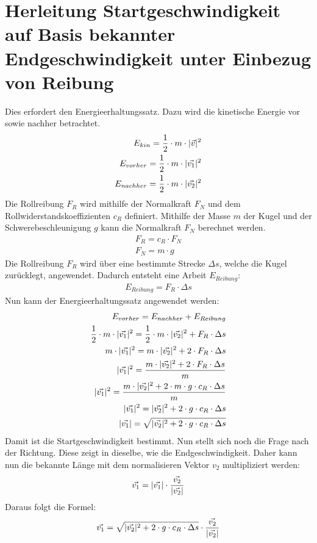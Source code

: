 \section{Herleitung Startgeschwindigkeit auf Basis bekannter Endgeschwindigkeit unter Einbezug von Reibung}\label{anhang:herleitung:StartgeschwAnhandEndgeschwMitReibung}
Dies erfordert den Energieerhaltungssatz. Dazu wird die kinetische Energie vor sowie nachher betrachtet.
\begin{align}
    E_{kin} = \frac{1}{2} \cdot m \cdot \lvert \vec{v} \rvert^2\\
    E_{vorher} = \frac{1}{2} \cdot m \cdot \lvert \vec{v_1} \rvert^2\\
    E_{nachher} = \frac{1}{2} \cdot m \cdot \lvert \vec{v_2} \rvert^2
\end{align}
Die Rollreibung $F_R$ wird mithilfe der Normalkraft $F_N$ und dem Rollwiderstandskoeffizienten $c_R$ definiert\cite{wiki.rollreibung:1}.
Mithilfe der Masse $m$ der Kugel und der Schwerebeschleunigung $g$ kann die Normalkraft $F_N$ berechnet werden.
\begin{align}
    F_R = c_R \cdot F_N\\
    F_N = m \cdot g
\end{align}
Die Rollreibung $F_R$ wird über eine bestimmte Strecke $\Delta s$, welche die Kugel zurücklegt, angewendet.
Dadurch entsteht eine Arbeit $E_{Reibung}$\cite{wiki.arbeit_physik:1}:
\begin{align}
    E_{Reibung} = F_R \cdot \Delta s
\end{align}
Nun kann der Energieerhaltungssatz angewendet werden:
\begin{align}
    E_{vorher} = E_{nachher} + E_{Reibung}\\
    \frac{1}{2} \cdot m \cdot \lvert \vec{v_1} \rvert^2 = \frac{1}{2} \cdot m \cdot \lvert \vec{v_2} \rvert^2 + F_R \cdot \Delta s\\
    m \cdot \lvert \vec{v_1} \rvert^2 = m \cdot \lvert \vec{v_2} \rvert^2 + 2 \cdot F_R \cdot \Delta s\\
    \lvert \vec{v_1} \rvert^2 = \frac{m \cdot \lvert \vec{v_2} \rvert^2 + 2 \cdot F_R \cdot \Delta s}{m}\\
    \lvert \vec{v_1} \rvert^2 = \frac{m \cdot \lvert \vec{v_2} \rvert^2 + 2 \cdot m \cdot g \cdot c_R \cdot \Delta s}{m}\\
    \lvert \vec{v_1} \rvert^2 = \lvert \vec{v_2} \rvert^2 + 2 \cdot g \cdot c_R \cdot \Delta s\\
    \lvert \vec{v_1} \rvert = \sqrt{\lvert \vec{v_2} \rvert^2 + 2 \cdot g \cdot c_R \cdot \Delta s}
\end{align}
Damit ist die Startgeschwindigkeit bestimmt. Nun stellt sich noch die Frage nach der Richtung. Diese zeigt in dieselbe,
wie die Endgeschwindigkeit. Daher kann nun die bekannte Länge mit dem normalisieren Vektor $v_2$ multipliziert
werden:
\begin{align}
    \vec{v_1} = \lvert \vec{v_1} \rvert \cdot \frac{\vec{v_2}}{\lvert \vec{v_2} \rvert}
\end{align}
Daraus folgt die Formel:
\begin{align}
    \vec{v_1} = \sqrt{\lvert \vec{v_2} \rvert^2 + 2 \cdot g \cdot c_R \cdot \Delta s} \cdot \frac{\vec{v_2}}{\lvert \vec{v_2} \rvert}
\end{align}
